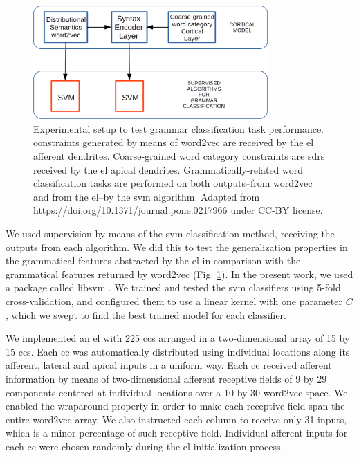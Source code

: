 {\begin{figure}[ht!]
    \centering
    \includegraphics[width=0.8\textwidth]{Experiment1.png}
    \caption{Experimental setup to test grammar classification task performance.
     constraints generated by means of word2vec are received by the \gls{el} afferent dendrites.
    Coarse-grained word category constraints are \glspl{sdr} received by the \gls{el} apical dendrites.
    Grammatically-related word classification tasks are performed on both outputs--from word2vec and from the \gls{el}--by the \gls{svm} algorithm.
    Adapted from https://doi.org/10.1371/journal.pone.0217966 under CC-BY license.}
    \label{fig:Experiment1}
\end{figure}

We used supervision by means of the \gls{svm} classification method, receiving the outputs from each algorithm. We did this to test the generalization properties in the grammatical features abstracted by the \gls{el} in comparison with the grammatical features returned by word2vec (Fig. \ref{fig:Experiment1}). In the present work, we used a package called \gls{libsvm} \cite{CC01a, libsvm}. We trained and tested the \gls{svm} classifiers using 5-fold cross-validation, and configured them to use a linear kernel with one parameter $C$, which we swept to find the best trained model for each classifier.

We implemented an \gls{el} with 225 \glspl{cc} arranged in a two-dimensional array of 15 by 15 \glspl{cc}. Each \gls{cc} was automatically distributed using individual locations along its afferent, lateral and apical inputs in a uniform way. Each \gls{cc} received afferent information by means of two-dimensional afferent receptive fields of 9 by 29 components centered at individual locations over a 10 by 30 word2vec space. We enabled the wraparound property in order to make each receptive field span the entire word2vec array. We also instructed each column to receive only 31 inputs, which is a minor percentage of such receptive field. Individual afferent inputs for each \gls{cc} were chosen randomly during the \gls{el} initialization process.

}
